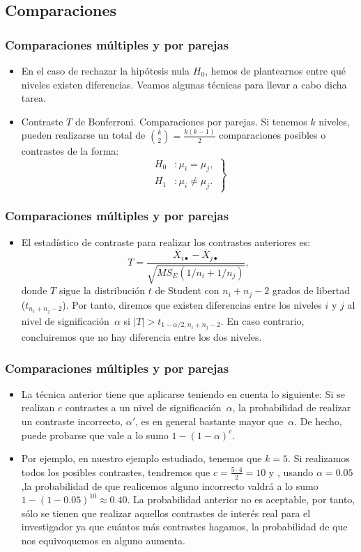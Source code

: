 \subsection{Comparaciones}
\begin{frame}
\frametitle{Comparaciones múltiples y por parejas}
\begin{itemize}
\item<2-> En el caso de rechazar la hipótesis nula $H_0$, hemos de plantearnos entre qué niveles existen diferencias. Veamos algunas técnicas para llevar a cabo dicha tarea.
\item<3-> Contraste $T$ de Bonferroni. Comparaciones por parejas. Si tenemos $k$ niveles, pueden realizarse un total de $\binom{k}{2}=\frac{k (k-1)}{2}$ comparaciones posibles o contrastes de la forma:
\[
\left.
\begin{array}{ll}
H_0 &: \mu_i = \mu_j, \\
H_1 &: \mu_i\not = \mu_j.
\end{array}
\right\}
\]
\end{itemize}
\end{frame}
\begin{frame}
\frametitle{Comparaciones múltiples y por parejas}
\begin{itemize}
\item<2-> El estadístico de contraste para realizar los contrastes anteriores es: 
\[
T=\frac{\overline{X}_{i\bullet} - \overline{X}_{j\bullet}}{\sqrt{MS_E (1/n_i +1/n_j)}},
\]
donde $T$ sigue la distribución $t$ de Student con $n_i + n_j -2$ grados de libertad ($t_{n_i +n_j -2}$). Por tanto, diremos que existen diferencias
entre los niveles $i$ y $j$ al nivel de significación~$\alpha$ si $|T|>t_{1-\alpha/2,n_i+n_j-2}$. En caso contrario, concluiremos que no hay
diferencia entre los dos niveles. 
\end{itemize}
\end{frame}
\begin{frame}
\frametitle{Comparaciones múltiples y por parejas}
\begin{itemize}
\item<2-> La técnica anterior tiene que aplicarse teniendo en cuenta lo siguiente: Si se realizan $c$ contrastes a un nivel de
significación~$\alpha$, la probabilidad de realizar un contraste incorrecto, $\alpha'$, es en general bastante mayor que~$\alpha$. De hecho, puede
probarse que vale a lo sumo $1-(1-\alpha)^c$.
\item<3-> Por ejemplo, en nuestro ejemplo estudiado, tenemos que $k=5$. Si realizamos todos los posibles contrastes, tendremos que $c=\frac{5\cdot 4}{2}=10$ y , usando $\alpha =0.05$,la probabilidad de que realicemos alguno incorrecto valdrá a lo sumo $1-(1-0.05)^{10} \approx 0.40$. La probabilidad anterior no es aceptable, por tanto, sólo se tienen que realizar aquellos contrastes de interés real para el investigador ya que cuántos más contrastes hagamos, la probabilidad de que nos equivoquemos en alguno aumenta. 
\end{itemize}
\end{frame}
